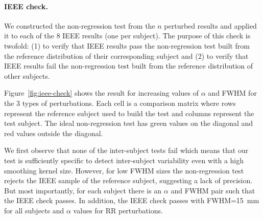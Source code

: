 \documentclass{article}
\begin{document}
\paragraph{IEEE check.} We constructed the non-regression test from the $n$ perturbed results and applied
it to each of the 8 IEEE results (one per subject).
The purpose of this check is twofold: (1) to verify that IEEE results pass the non-regression test built
from the reference distribution of their corresponding subject and (2) to verify that IEEE results fail the non-regression test
built from the reference distribution of other subjects.

Figure~\ref{fig:ieee-check} shows the result for increasing values of $\alpha$ and FWHM for the 3 types of perturbations.
Each cell is a comparison matrix where rows represent the reference subject used to build the test and columns represent
the test subject. The ideal non-regression test has green values on the diagonal and red values outside the diagonal.

We first observe that none of the inter-subject tests fail which means
that our test is sufficiently specific to detect
inter-subject variability even with a high smoothing kernel size. However, for low FWHM sizes the non-regression test rejects the IEEE sample of the reference subject,
suggesting a lack of precision. But most importantly, for each subject there is an $\alpha$ and FWHM pair
such that the IEEE check passes. In addition, the IEEE check passes with FWHM=15~mm for all subjects and $\alpha$ values for RR perturbations.
\end{document}
